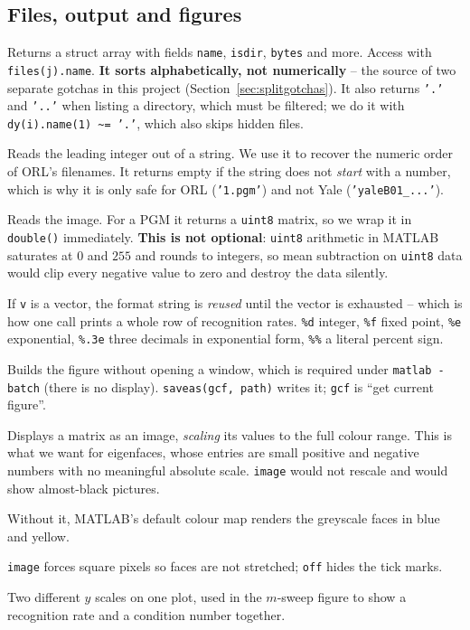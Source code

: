 \documentclass[11pt]{article}
\theoremstyle{definition}
\theoremstyle{remark}
\begin{document}
\subsection{Files, output and figures}

\begin{description}[leftmargin=*,style=nextline]
\item[\texttt{dir(pattern)}] Returns a struct array with fields \texttt{name},
  \texttt{isdir}, \texttt{bytes} and more. Access with \texttt{files(j).name}.
  \textbf{It sorts alphabetically, not numerically} -- the source of two separate
  gotchas in this project (Section~\ref{sec:splitgotchas}). It also returns
  \texttt{'.'} and \texttt{'..'} when listing a directory, which must be filtered;
  we do it with \texttt{dy(i).name(1) \textasciitilde= '.'}, which also skips
  hidden files.
\item[\texttt{sscanf(s, '\%d')}] Reads the leading integer out of a string. We use
  it to recover the numeric order of ORL's filenames. It returns empty if the
  string does not \emph{start} with a number, which is why it is only safe for ORL
  (\texttt{'1.pgm'}) and not Yale (\texttt{'yaleB01\_...'}).
\item[\texttt{imread}] Reads the image. For a PGM it returns a \texttt{uint8}
  matrix, so we wrap it in \texttt{double()} immediately. \textbf{This is not
  optional}: \texttt{uint8} arithmetic in MATLAB saturates at $0$ and $255$ and
  rounds to integers, so mean subtraction on \texttt{uint8} data would clip every
  negative value to zero and destroy the data silently.
\item[\texttt{fprintf('\%.1f ', v)}] If \texttt{v} is a vector, the format string
  is \emph{reused} until the vector is exhausted -- which is how one call prints a
  whole row of recognition rates. \texttt{\%d} integer, \texttt{\%f} fixed point,
  \texttt{\%e} exponential, \texttt{\%.3e} three decimals in exponential form,
  \texttt{\%\%} a literal percent sign.
\item[\texttt{figure('Visible','off')}] Builds the figure without opening a window,
  which is required under \texttt{matlab -batch} (there is no display).
  \texttt{saveas(gcf, path)} writes it; \texttt{gcf} is ``get current figure''.
\item[\texttt{imagesc}] Displays a matrix as an image, \emph{scaling} its values to
  the full colour range. This is what we want for eigenfaces, whose entries are
  small positive and negative numbers with no meaningful absolute scale.
  \texttt{image} would not rescale and would show almost-black pictures.
\item[\texttt{colormap gray}] Without it, MATLAB's default colour map renders the
  greyscale faces in blue and yellow.
\item[\texttt{axis image off}] \texttt{image} forces square pixels so faces are not
  stretched; \texttt{off} hides the tick marks.
\item[\texttt{yyaxis left/right}] Two different $y$ scales on one plot, used in the
  $m$-sweep figure to show a recognition rate and a condition number together.
\end{description}
\end{document}
